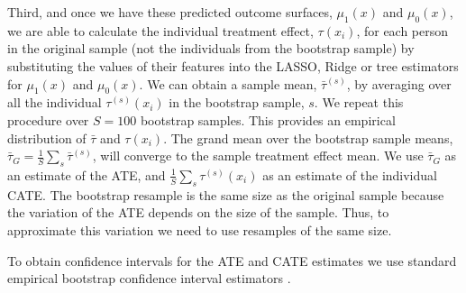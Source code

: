 \documentclass[12pt, a4paper]{article}
\begin{document}
Third, and once we have these predicted outcome surfaces, $\mu_1(x)$ and
$\mu_0(x)$, we are able to calculate the individual treatment effect,
$\tau(x_i)$, for each person in the original sample (not the individuals from
the bootstrap sample) by substituting the values of their features into the
LASSO, Ridge or tree estimators for $\mu_1(x)$ and $\mu_0(x)$. We can obtain a
sample mean, $\bar{\tau}^{(s)}$, by averaging over all the individual
$\tau^{(s)}(x_i)$ in the bootstrap sample, $s$. We repeat this procedure over
$S=100$ bootstrap samples. This provides an empirical distribution of
$\bar{\tau}$ and $\tau(x_i)$. The grand mean over the bootstrap sample means,
$\bar{\tau}_G = \frac{1}{S} \sum_s \bar{\tau}^{(s)}$, will converge to the
sample treatment effect mean. We use $\bar{\tau}_G$ as an estimate of the ATE,
and $\frac{1}{S} \sum_s \tau^{(s)}(x_i)$ as an estimate of the individual CATE.
The bootstrap resample is the same size as the original sample because the
variation of the ATE depends on the size of the sample. Thus, to approximate
this variation we need to use resamples of the same size.



To obtain confidence intervals for the ATE and CATE estimates we use standard
empirical bootstrap confidence interval estimators \citep{efron1986}.

\end{document}
